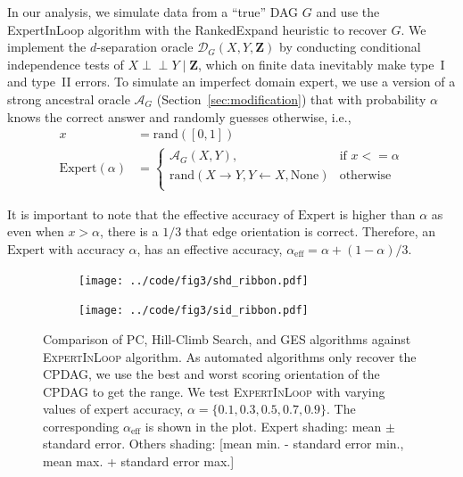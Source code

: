 \documentclass[accepted]{uai2025} %
\def\ci{\perp\!\!\!\!\perp}
\begin{document}
In our analysis, we simulate data from a ``true'' DAG $G$ and use the
{\sc ExpertInLoop} algorithm with the {\sc RankedExpand} heuristic 
to recover $G$. We implement the $d$-separation oracle $\mathcal{D}_G(X,Y,\mathbf{Z})$
by conducting conditional independence tests of $X \ci Y \mid \mathbf{Z}$, which on finite
data inevitably make type~I and type~II errors. To
simulate an imperfect domain expert, we use a version of a strong 
ancestral oracle $\mathcal{A}_G$ (Section~\ref{sec:modification})
that with probability $\alpha$ knows the correct answer and randomly
guesses otherwise, i.e.,
\begin{equation*}
	\begin{split}
		x &= \textrm{rand}([0, 1]) \\
		\mathrm{Expert}(\alpha) &= \begin{cases} 
			\mathcal{A}_G(X, Y),  & \textrm{if  } x <= \alpha \\
			\textrm{rand}(X \rightarrow Y, Y \leftarrow X, \textrm{None}) & \textrm{otherwise} \\
				\end{cases} 
	\end{split}
\end{equation*}

It is important to note that the effective accuracy of $ \mathrm{Expert} $ is
higher than $ \alpha $ as even when $ x > \alpha $, there is a $ 1/3 $
that edge orientation is correct. Therefore, an $ \mathrm{Expert} $ with
accuracy $ \alpha $, has an effective accuracy, $ \alpha_{\mathrm{eff}} =
\alpha + (1 - \alpha) / 3 $.

\begin{figure}[t!]
	\centering
	\begin{subfigure}{0.5\textwidth}
		\centering
		\texttt{[image: ../code/fig3/shd\_ribbon.pdf]}
		\caption{}
	\end{subfigure}
	\begin{subfigure}{0.5\textwidth}
		\centering
		\texttt{[image: ../code/fig3/sid\_ribbon.pdf]}
		\caption{}
	\end{subfigure}
	\caption{Comparison of PC, Hill-Climb Search, and GES algorithms against
		\textsc{ExpertInLoop} algorithm. As automated algorithms only
		recover the CPDAG, we use the best and worst scoring
		orientation of the CPDAG to get the range. We test
		\textsc{ExpertInLoop} with varying values of expert accuracy, $ \alpha = \{0.1, 0.3, 0.5, 0.7, 0.9\} $. The corresponding
	$\alpha_{\textrm{eff}} $ is shown in the plot. Expert shading: mean $\pm$ standard error. Others shading: [mean min. - standard error min., mean max. + standard error max.]}
	\label{fig:shd_sid}
\end{figure}
\end{document}
